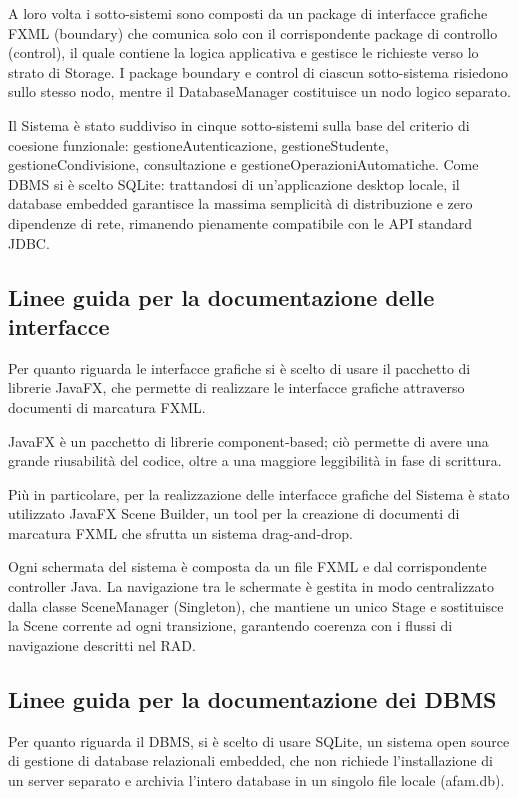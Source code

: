 \documentclass[12pt,a4paper]{article}
\begin{document}
A loro volta i sotto-sistemi sono composti da un package di interfacce grafiche FXML (boundary) che comunica solo con il corrispondente package di controllo (control), il quale contiene la logica applicativa e gestisce le richieste verso lo strato di Storage. I package boundary e control di ciascun sotto-sistema risiedono sullo stesso nodo, mentre il DatabaseManager costituisce un nodo logico separato.

Il Sistema è stato suddiviso in cinque sotto-sistemi sulla base del criterio di coesione funzionale: gestioneAutenticazione, gestioneStudente, gestioneCondivisione, consultazione e gestioneOperazioniAutomatiche. Come DBMS si è scelto SQLite: trattandosi di un'applicazione desktop locale, il database embedded garantisce la massima semplicità di distribuzione e zero dipendenze di rete, rimanendo pienamente compatibile con le API standard JDBC.

\subsection{Linee guida per la documentazione delle interfacce}

Per quanto riguarda le interfacce grafiche si è scelto di usare il pacchetto di librerie JavaFX, che permette di realizzare le interfacce grafiche attraverso documenti di marcatura FXML.

JavaFX è un pacchetto di librerie component-based; ciò permette di avere una grande riusabilità del codice, oltre a una maggiore leggibilità in fase di scrittura.

Più in particolare, per la realizzazione delle interfacce grafiche del Sistema è stato utilizzato JavaFX Scene Builder, un tool per la creazione di documenti di marcatura FXML che sfrutta un sistema drag-and-drop.

Ogni schermata del sistema è composta da un file FXML e dal corrispondente controller Java. La navigazione tra le schermate è gestita in modo centralizzato dalla classe SceneManager (Singleton), che mantiene un unico Stage e sostituisce la Scene corrente ad ogni transizione, garantendo coerenza con i flussi di navigazione descritti nel RAD.

\subsection{Linee guida per la documentazione dei DBMS}

Per quanto riguarda il DBMS, si è scelto di usare SQLite, un sistema open source di gestione di database relazionali embedded, che non richiede l'installazione di un server separato e archivia l'intero database in un singolo file locale (afam.db).
\end{document}
